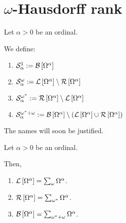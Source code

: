 \section{\texorpdfstring{$\omega$}{omega}-Hausdorff rank}

\begin{definitions}
  Let $\alpha > 0$ be an ordinal.

  We define:
  \begin{enumerate}
    \item $\mathcal{S}^{1}_{\alpha} := \mathcal{B} \left[ {{\Omega^{\alpha}}} \right]$
    \item $\mathcal{S}^{\omega}_{\alpha} := \mathcal{L} \left[ {{\Omega^{\alpha}}} \right] \setminus \mathcal{R} \left[ {{\Omega^{\alpha}}} \right]$
    \item $\mathcal{S}^{\omega^\ast}_{\alpha} := \mathcal{R} \left[ {{\Omega^{\alpha}}} \right] \setminus \mathcal{L} \left[ {{\Omega^{\alpha}}} \right]$
    \item $\mathcal{S}^{\omega^\ast + \omega}_{\alpha} := \mathcal{B} \left[ {{\Omega^{\alpha}}} \right] \setminus \left( { \mathcal{L} \left[ {{\Omega^{\alpha}}} \right] \cup \mathcal{R} \left[ {{\Omega^{\alpha}}} \right] } \right)$
  \end{enumerate}

  The names will soon be justified.
\end{definitions}

\begin{lemma}
  Let $\alpha > 0$ be an ordinal.

  Then,
  \begin{enumerate}
    \item $\mathcal{L} \left[ {{\Omega^{\alpha}}} \right] = \sum_{\omega}{\Omega^{\alpha}}$.
    \item $\mathcal{R} \left[ {{\Omega^{\alpha}}} \right] = \sum_{\omega^\ast}{\Omega^{\alpha}}$.
    \item $\mathcal{B} \left[ {{\Omega^{\alpha}}} \right] = \sum_{\omega^\ast + \omega}{\Omega^{\alpha}}$.
  \end{enumerate}
\end{lemma}

